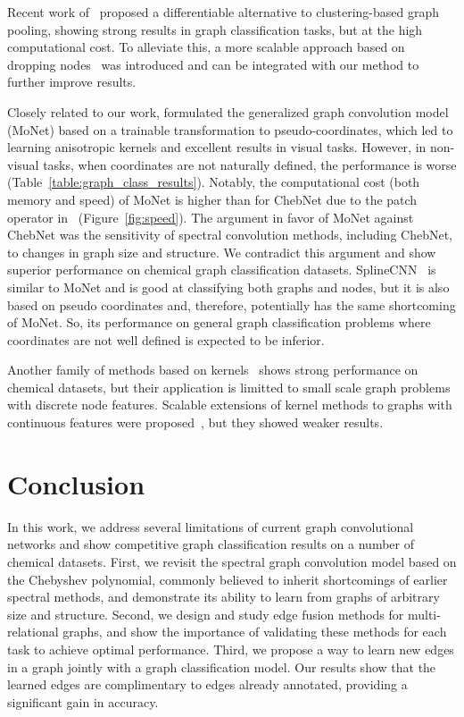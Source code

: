 \documentclass[final,nonatbib]{article} \usepackage{nips_2018}
\begin{document}
	Recent work of~\cite{ying2018hierarchical} proposed a differentiable alternative to clustering-based graph pooling, showing strong results in graph classification tasks, but at the high computational cost. To alleviate this, a more scalable approach based on dropping nodes~\cite{graphunet2018, cangea2018towards} was introduced and can be integrated with our method to further improve results.

	Closely related to our work, \cite{monti2017geometric} formulated the generalized graph convolution model (MoNet) based on a trainable transformation to pseudo-coordinates, which led to learning anisotropic kernels and excellent results in visual tasks. However, in non-visual tasks, when coordinates are not naturally defined, the performance is worse (Table~\ref{table:graph_class_results}). Notably, the computational cost (both memory and speed) of MoNet is higher than for ChebNet due to the patch operator in~\cite[Eq. (9)-(11)]{monti2017geometric} (Figure~\ref{fig:speed}). The argument in favor of MoNet against ChebNet was the sensitivity of spectral convolution methods, including ChebNet, to changes in graph size and structure. We contradict this argument and show superior performance on chemical graph classification datasets.
	SplineCNN~\cite{fey2018splinecnn} is similar to MoNet and is good at classifying both graphs and nodes, but it is also based on pseudo coordinates and, therefore, potentially has the same shortcoming of MoNet. So, its performance on general graph classification problems where coordinates are not well defined is expected to be inferior.

	Another family of methods based on kernels~\cite{shervashidze2011weisfeiler, kriege2016valid} shows strong performance on chemical datasets,	but their application is limitted to small scale graph problems with discrete node features. Scalable extensions of	kernel methods to graphs with continuous features were
	proposed~\cite{niepert2016learning, yanardag2015deep}, but they showed weaker results.


	\section{Conclusion}
	\label{sec:conclusion}
	In this work, we address several limitations of current graph convolutional networks and show competitive graph classification results on a number of chemical datasets. First, we revisit the spectral graph convolution model based on the Chebyshev polynomial, commonly believed to inherit shortcomings of earlier spectral methods, and demonstrate its ability to learn from graphs of arbitrary size and structure. Second, we design and study edge fusion methods for multi-relational graphs, and show the importance of validating these methods for each task to achieve optimal performance. Third, we propose a way to learn new edges in a graph jointly with a graph classification model. Our results show that the learned edges are complimentary to edges already annotated, providing a significant gain in accuracy.
\end{document}
